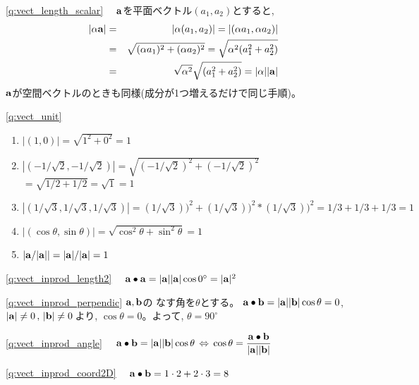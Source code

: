 \ref{q:vect_length_scalar}　
${\bf a}$を平面ベクトル$(a_1, a_2)$とすると, 
\begin{eqnarray*}
|\alpha{\bf a}|&=&|\alpha(a_1, a_2)|=|(\alpha a_1, \alpha a_2)|\nonumber\\
&=&\sqrt{(\alpha a_1)^2+(\alpha a_2)^2}=\sqrt{\alpha^2(a_1^2+a_2^2)}\nonumber\\
&=&\sqrt{\alpha^2}\sqrt{(a_1^2+a_2^2)}=|\alpha||{\bf a}|
\end{eqnarray*}
${\bf a}$が空間ベクトルのときも同様(成分が1つ増えるだけで同じ手順)。
\vspace{0.1cm}

\ref{q:vect_unit} 
\begin{enumerate}
\item $|(1, 0)|=\sqrt{1^2+0^2}=1$
\item $|(-1/\sqrt{2}, -1/\sqrt{2})|=\sqrt{(-1/\sqrt{2})^2+(-1/\sqrt{2})^2}$\\$=\sqrt{1/2+1/2}=\sqrt{1}=1$
\item $|(1/\sqrt{3}, 1/\sqrt{3}, 1/\sqrt{3})|=(1/\sqrt{3}))^2+(1/\sqrt{3}))^2*(1/\sqrt{3}))^2=
1/3+1/3+1/3=1$
\item $|(\cos\theta, \sin\theta)|=\sqrt{\cos^2\theta+\sin^2\theta}=1$
\item $|{\bf a}/|{\bf a}||=|{\bf a}|/|{\bf a}|=1$
\end{enumerate}
\hv

\ref{q:vect_inprod_length2}　
${\bf a}\bullet{\bf a}=|{\bf a}||{\bf a}|\cos 0^{\circ} =|{\bf a}|^2$
\hv

\ref{q:vect_inprod_perpendic} ${\bf a}, {\bf b}$の
なす角を$\theta$とする。
${\bf a}\bullet{\bf b}=|{\bf a}||{\bf b}|\cos\theta =0$, 
$|{\bf a}|\neq 0\,,\,|{\bf b}|\neq 0$\,より, 
$\cos\theta =0$。よって, $\theta=90^\circ$
\hv

\ref{q:vect_inprod_angle}　
${\bf a}\bullet{\bf b}=|{\bf a}||{\bf b}|\cos\theta\,\Leftrightarrow\,
\cos\theta =\dfrac{{\bf a}\bullet{\bf b}}{|{\bf a}||{\bf b}|}$
\hv


\ref{q:vect_inprod_coord2D}　
${\bf a} \bullet {\bf b} = 1 \cdot 2+2 \cdot 3=8$\hv

